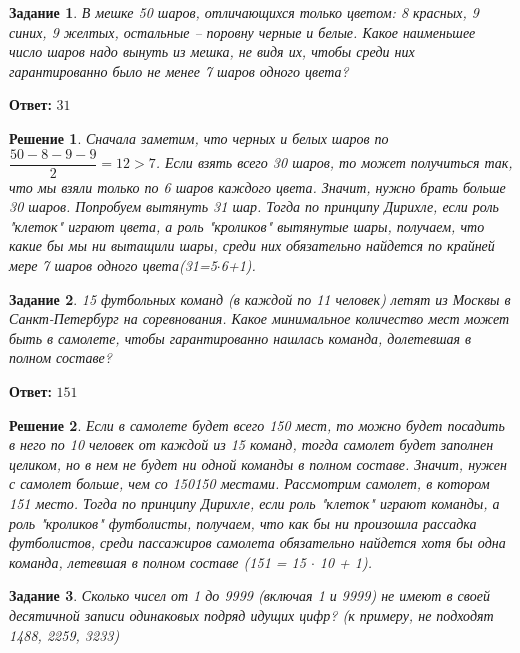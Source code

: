 \documentclass[a4paper,oneside]{memoir}
\newtheorem{task}{Задание}
\newtheorem{solution}{Решение}
\begin{document}
\hrulefill

\begin{task}
	В мешке 50 шаров, отличающихся только цветом: 8 красных, 9 синих, 9 желтых, остальные – поровну черные и белые. Какое наименьшее число шаров надо вынуть из мешка, не видя их, чтобы среди них гарантированно было не менее 7 шаров одного цвета?
\end{task}

\textbf{Ответ:} $ 31 $

\begin{solution}
	Сначала заметим, что черных и белых шаров по $ \dfrac{50 - 8 - 9 - 9}{2} = 12 > 7 $. Если взять всего 30 шаров, то может получиться так, что мы взяли только по 6 шаров каждого цвета. Значит, нужно брать больше 30 шаров. Попробуем вытянуть 31 шар. Тогда по принципу Дирихле, если роль "клеток" играют цвета, а роль "кроликов" вытянутые шары, получаем, что какие бы мы ни вытащили шары, среди них обязательно найдется по крайней мере 7 шаров одного цвета(31=5$\cdot$6+1).
\end{solution}

\hrulefill

\begin{task}
15 футбольных команд (в каждой по 11 человек) летят из Москвы в Санкт-Петербург на соревнования. Какое минимальное количество мест может быть в самолете, чтобы гарантированно нашлась команда, долетевшая в полном составе?
\end{task}

\textbf{Ответ:} $ 151 $

\begin{solution}
Если в самолете будет всего 150 мест, то можно будет посадить в него по 10 человек от каждой из 15 команд, тогда самолет будет заполнен целиком, но в нем не будет ни одной команды в полном составе. Значит, нужен с самолет больше, чем со 150150 местами. Рассмотрим самолет, в котором 151 место. Тогда по принципу Дирихле, если роль "клеток" играют команды, а роль "кроликов" футболисты, получаем, что как бы ни произошла рассадка футболистов, среди пассажиров самолета обязательно найдется хотя бы одна команда, летевшая в полном составе (151 = 15 $ \cdot $ 10 + 1).
\end{solution}

\hrulefill

\begin{task}
	Сколько чисел от 1 до 9999 (включая 1 и 9999) не имеют в своей десятичной записи одинаковых подряд идущих цифр? (к примеру, не подходят 1488, 2259, 3233)
\end{task}
\end{document}
